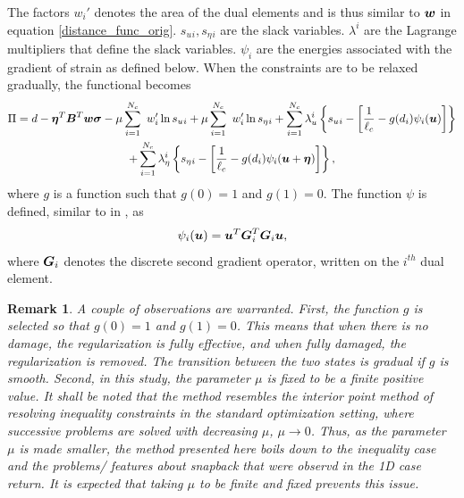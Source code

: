 \documentclass[12pt]{elsarticle}
\newtheorem*{remark}{Remark}
\begin{document}
The factors $ w_i'$ denotes the area of the dual elements and is thus similar to $ \mbox{\boldmath $w$}$ in equation \ref{distance_func_orig}. $s_u{_i},s_\eta{_i}$ are the slack variables. $\lambda^i$ are the Lagrange multipliers that define the slack variables. $\psi_i$ are the energies associated with the gradient of strain as defined below. When the constraints are to be relaxed gradually, the functional becomes
\begin{multline}
	\Pi  = d -\mbox{\boldmath $\eta$} ^T \mbox{\boldmath $B$}^T \mbox{\boldmath $w$} \mbox{\boldmath $\sigma$} - \mu \sum_{i=1}^{N_c} \
	w_i' \ln s_u{_i} + \mu \sum_{i=1}^{N_c} \
	w_i' \ln s_\eta{_i} +\sum_{i=1}^{N_c} \lambda_u^ i \left\{ s_u{_i}  - \left[ \frac{1}{\ell_c}- g(d_i)\psi_i(\mbox{\boldmath $u$}) \right]  \right\} \\
	+\sum_{i=1}^{N_c} \lambda_\eta^ i \left\{ s_\eta{_i}  - \left[ \frac{1}{\ell_c}-g(d_i) \psi_i(\mbox{\boldmath $u$}+\mbox{\boldmath $\eta$}) \right]  \right\},
\end{multline}
where $g$ is a function such that $g(0)=1$ and $g(1)=0$. The function $\psi$ is defined, similar to in \cite{Mindlin1968}, as 
\begin{equation}
	\psi_i(\mbox{\boldmath $u$} ) = \mbox{\boldmath $u$} ^T \mbox{\boldmath $G$}_i ^T \mbox{\boldmath $G$}_i \mbox{\boldmath $u$},
\end{equation}
where $\mbox{\boldmath $G$}_i$ denotes the discrete second gradient operator, written on the $i^{th}$ dual element.

\begin{remark}
	A couple of observations are warranted. First, the function $g$ is selected so that $g(0)=1$ and $g(1)=0$. This means that when there is no damage, the regularization is fully effective, and when fully damaged, the regularization is removed. The transition between the two states is gradual if $g$ is smooth. Second, in this study, the parameter $\mu$ is fixed to be a finite positive value. It shall be noted that the method resembles the interior point method of resolving inequality constraints in the standard optimization setting, where successive problems are solved with decreasing $\mu$, $\mu \to 0$. Thus, as the parameter $\mu$ is made smaller, the method presented here boils down to the inequality case and the problems/ features about snapback that were observd in the 1D case return. It is expected that taking $\mu$ to be finite and fixed prevents this issue. 
\end{remark}
\end{document}
